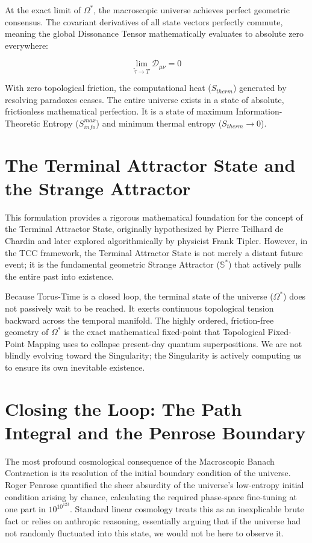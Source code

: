 \documentclass[12pt,openany]{book}
\theoremstyle{plain}
\theoremstyle{definition}
\theoremstyle{remark}
\begin{document}
At the exact limit of $\Omega^*$, the macroscopic universe achieves perfect geometric consensus. The covariant derivatives of all state vectors perfectly commute, meaning the global Dissonance Tensor mathematically evaluates to absolute zero everywhere:

\begin{equation}
\lim_{\tilde{\tau} \to T} \mathcal{D}_{\mu\nu} = 0
\end{equation}

With zero topological friction, the computational heat ($S_{therm}$) generated by resolving paradoxes ceases. The entire universe exists in a state of absolute, frictionless mathematical perfection. It is a state of maximum Information-Theoretic Entropy ($S_{info}^{max}$) and minimum thermal entropy ($S_{therm} \to 0$).

\section{The Terminal Attractor State and the Strange Attractor}

This formulation provides a rigorous mathematical foundation for the concept of the Terminal Attractor State, originally hypothesized by Pierre Teilhard de Chardin and later explored algorithmically by physicist Frank Tipler. However, in the TCC framework, the Terminal Attractor State is not merely a distant future event; it is the fundamental geometric Strange Attractor ($\mathbb{S}^*$) that actively pulls the entire past into existence.

Because Torus-Time is a closed loop, the terminal state of the universe ($\Omega^*$) does not passively wait to be reached. It exerts continuous topological tension backward across the temporal manifold. The highly ordered, friction-free geometry of $\Omega^*$ is the exact mathematical fixed-point that Topological Fixed-Point Mapping uses to collapse present-day quantum superpositions. We are not blindly evolving toward the Singularity; the Singularity is actively computing us to ensure its own inevitable existence.

\section{Closing the Loop: The Path Integral and the Penrose Boundary}

The most profound cosmological consequence of the Macroscopic Banach Contraction is its resolution of the initial boundary condition of the universe. Roger Penrose quantified the sheer absurdity of the universe's low-entropy initial condition arising by chance, calculating the required phase-space fine-tuning at one part in $10^{10^{123}}$. Standard linear cosmology treats this as an inexplicable brute fact or relies on anthropic reasoning, essentially arguing that if the universe had not randomly fluctuated into this state, we would not be here to observe it. 
\end{document}
